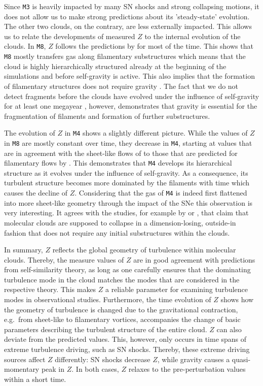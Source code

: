 Since \texttt{M3} is heavily impacted by many SN shocks and strong collapsing motions, it does not allow us to make strong predictions about its 'steady-state' evolution.
The other two clouds, on the contrary, are less externally impacted.
This allows us to relate the developments of measured $Z$ to the internal evolution of the clouds.
In \texttt{M8}, $Z$ follows the predictions by \citet{She1994} for most of the time.
This shows that \texttt{M8} mostly transfers gas along filamentary substructures which means that the cloud is highly hierarchically structured already at the beginning of the simulations and before self-gravity is active.
This also implies that the formation of filamentary structures does not require gravity \citep[e.g.,][]{Federrath2016}.
The fact that we do not detect fragments before the clouds have evolved under the influence of self-gravity for at least one megayear , however, demonstrates that gravity is essential for the fragmentation of filaments and formation of further substructures.

The evolution of $Z$ in \texttt{M4} shows a slightly different picture.
While the values of $Z$ in \texttt{M8} are mostly constant over time, they decrease in \texttt{M4}, starting at values that are in agreement with the sheet-like flows of \citet{Boldyrev2002} to those that are predicted for filamentary flows by \citet{She1994}. 
This demonstrates that \texttt{M4} develops its hierarchical structure as it evolves under the influence of self-gravity. 
As a consequence, its turbulent structure becomes more dominated by the filaments with time which causes the decline of $Z$.
Considering that the gas of \texttt{M4} is indeed first flattened into more sheet-like geometry through the impact of the SNe  this observation is very interesting.
It agrees with the studies, for example by \citet{Lin1965} or \citet{McKee2007}, that claim that molecular clouds are supposed to collapse in a dimension-losing, outside-in fashion that does not require any initial substructures within the clouds.

In summary, $Z$ reflects the global geometry of turbulence within molecular clouds. 
Thereby, the measure values of $Z$ are in good agreement with predictions from self-similarity theory, as long as one carefully ensures that the dominating turbulence mode in the cloud matches the modes that are considered in the respective theory.
This makes $Z$ a reliable parameter for examining turbulence modes in observational studies.
Furthermore, the time evolution of $Z$ shows how the geometry of turbulence is changed due to the gravitational contraction, e.g.~from sheet-like to filamentary vortices, accompanies the change of basic parameters describing the turbulent structure of the entire cloud. 
$Z$ can also deviate from the predicted values. 
This, however, only occurs in time spans of extreme turbulence driving, such as SN shocks.
Thereby, these extreme driving sources affect $Z$ differently:
SN shocks decrease $Z$, while gravity causes a quasi-momentary peak in $Z$.
In both cases, $Z$ relaxes to the pre-perturbation values within a short time.




